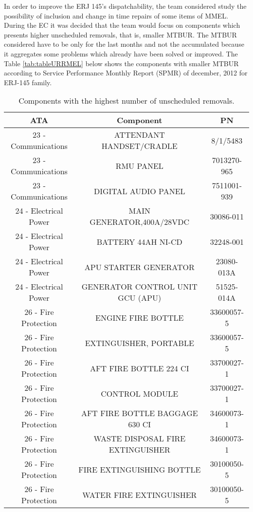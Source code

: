 In order to improve the ERJ 145's dispatchability, the team considered study the possibility of inclusion and change in time repairs of some items of MMEL.
During the EC it was decided that the team would focus on components which presents higher unscheduled removals, that is, smaller MTBUR.
The MTBUR considered have to be only for the last months and not the accumulated because it aggregates some problems which already have been solved or improved.
The Table \ref{tab:tableURRMEL} below shows the components with smaller MTBUR according to Service Performance Monthly Report (SPMR) of december, 2012 for ERJ-145 family.

\begin{table}[H]
  \centering
  \caption{Components with the highest number of unscheduled removals.}
    \begin{tabular}{ccc}
    \toprule
    \textbf{ATA} & \textbf{Component} & \textbf{PN} \\
    \midrule
    23 - Communications & ATTENDANT HANDSET/CRADLE & 8/1/5483 \\
    23 - Communications & RMU PANEL & 7013270-965 \\
    23 - Communications & DIGITAL AUDIO PANEL & 7511001-939 \\
    24 - Electrical Power & MAIN GENERATOR,400A/28VDC & 30086-011 \\
    24 - Electrical Power & BATTERY 44AH NI-CD & 32248-001 \\
    24 - Electrical Power & APU STARTER GENERATOR & 23080-013A \\
    24 - Electrical Power & GENERATOR CONTROL UNIT GCU (APU) & 51525-014A \\
    26 - Fire Protection & ENGINE FIRE BOTTLE & 33600057-5 \\
    26 - Fire Protection & EXTINGUISHER, PORTABLE & 33600057-5 \\
    26 - Fire Protection & AFT FIRE BOTTLE 224 CI & 33700027-1 \\
    26 - Fire Protection & CONTROL MODULE & 33700027-1 \\
    26 - Fire Protection & AFT FIRE BOTTLE BAGGAGE 630 CI & 34600073-1 \\
    26 - Fire Protection & WASTE DISPOSAL FIRE EXTINGUISHER & 34600073-1 \\
    26 - Fire Protection & FIRE EXTINGUISHING BOTTLE & 30100050-5 \\
    26 - Fire Protection & WATER FIRE EXTINGUISHER & 30100050-5 \\

\end{tabular}
\end{table}
